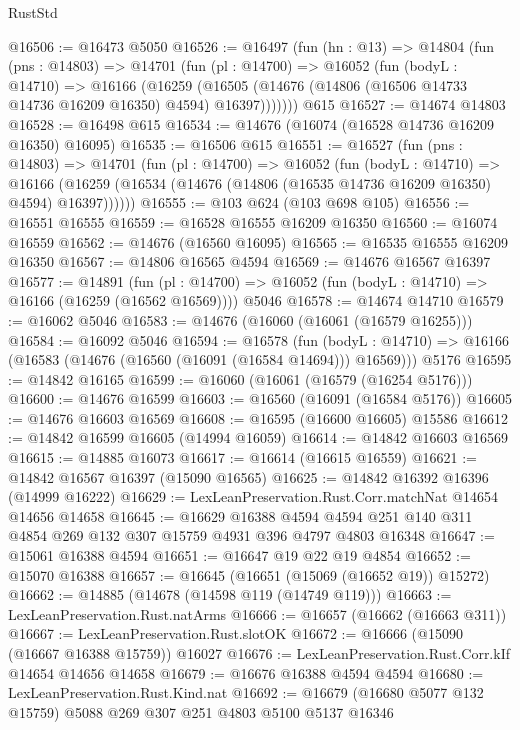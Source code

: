 \begin{lexlean}{RustStd}
\begin{coremodule}
@16506 := @16473 @5050
@16526 := @16497
    (fun (hn : @13) =>
    @14804
      (fun (pns : @14803) =>
      @14701
        (fun (pl : @14700) =>
        @16052
          (fun (bodyL : @14710) =>
          @16166
            (@16259
              (@16505 (@14676 (@14806 (@16506 @14733 @14736 @16209 @16350) @4594) @16397)))))))
    @615
@16527 := @14674 @14803
@16528 := @16498 @615
@16534 := @14676 (@16074 (@16528 @14736 @16209 @16350) @16095)
@16535 := @16506 @615
@16551 := @16527
    (fun (pns : @14803) =>
    @14701
      (fun (pl : @14700) =>
      @16052
        (fun (bodyL : @14710) =>
        @16166 (@16259 (@16534 (@14676 (@14806 (@16535 @14736 @16209 @16350) @4594) @16397))))))
@16555 := @103 @624 (@103 @698 @105)
@16556 := @16551 @16555
@16559 := @16528 @16555 @16209 @16350
@16560 := @16074 @16559
@16562 := @14676 (@16560 @16095)
@16565 := @16535 @16555 @16209 @16350
@16567 := @14806 @16565 @4594
@16569 := @14676 @16567 @16397
@16577 := @14891
    (fun (pl : @14700) => @16052 (fun (bodyL : @14710) => @16166 (@16259 (@16562 @16569))))
    @5046
@16578 := @14674 @14710
@16579 := @16062 @5046
@16583 := @14676 (@16060 (@16061 (@16579 @16255)))
@16584 := @16092 @5046
@16594 := @16578
    (fun (bodyL : @14710) => @16166 (@16583 (@14676 (@16560 (@16091 (@16584 @14694))) @16569)))
    @5176
@16595 := @14842 @16165
@16599 := @16060 (@16061 (@16579 (@16254 @5176)))
@16600 := @14676 @16599
@16603 := @16560 (@16091 (@16584 @5176))
@16605 := @14676 @16603 @16569
@16608 := @16595 (@16600 @16605) @15586
@16612 := @14842 @16599 @16605 (@14994 @16059)
@16614 := @14842 @16603 @16569
@16615 := @14885 @16073
@16617 := @16614 (@16615 @16559)
@16621 := @14842 @16567 @16397 (@15090 @16565)
@16625 := @14842 @16392 @16396 (@14999 @16222)
@16629 := LexLeanPreservation.Rust.Corr.matchNat @14654 @14656 @14658
@16645 := @16629
    @16388
    @4594
    @4594
    @251
    @140
    @311
    @4854
    @269
    @132
    @307
    @15759
    @4931
    @396
    @4797
    @4803
    @16348
@16647 := @15061 @16388 @4594
@16651 := @16647 @19 @22 @19 @4854
@16652 := @15070 @16388
@16657 := @16645 (@16651 (@15069 (@16652 @19)) @15272)
@16662 := @14885 (@14678 (@14598 @119 (@14749 @119)))
@16663 := LexLeanPreservation.Rust.natArms
@16666 := @16657 (@16662 (@16663 @311))
@16667 := LexLeanPreservation.Rust.slotOK
@16672 := @16666 (@15090 (@16667 @16388 @15759)) @16027
@16676 := LexLeanPreservation.Rust.Corr.kIf @14654 @14656 @14658
@16679 := @16676 @16388 @4594 @4594
@16680 := LexLeanPreservation.Rust.Kind.nat
@16692 := @16679 (@16680 @5077 @132 @15759) @5088 @269 @307 @251 @4803 @5100 @5137 @16346

\end{coremodule}
\end{lexlean}
